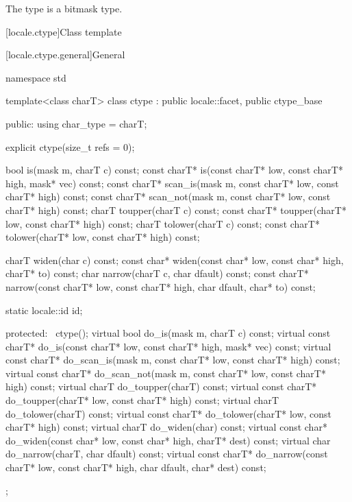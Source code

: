 \pnum
The type  is a bitmask type.

[locale.ctype]{Class template }

[locale.ctype.general]{General}

%
\begin{codeblock}
namespace std {
  template<class charT>
    class ctype : public locale::facet, public ctype_base {
    public:
      using char_type = charT;

      explicit ctype(size_t refs = 0);

      bool         is(mask m, charT c) const;
      const charT* is(const charT* low, const charT* high, mask* vec) const;
      const charT* scan_is(mask m, const charT* low, const charT* high) const;
      const charT* scan_not(mask m, const charT* low, const charT* high) const;
      charT        toupper(charT c) const;
      const charT* toupper(charT* low, const charT* high) const;
      charT        tolower(charT c) const;
      const charT* tolower(charT* low, const charT* high) const;

      charT        widen(char c) const;
      const char*  widen(const char* low, const char* high, charT* to) const;
      char         narrow(charT c, char dfault) const;
      const charT* narrow(const charT* low, const charT* high, char dfault, char* to) const;

      static locale::id id;

    protected:
      ~ctype();
      virtual bool         do_is(mask m, charT c) const;
      virtual const charT* do_is(const charT* low, const charT* high, mask* vec) const;
      virtual const charT* do_scan_is(mask m, const charT* low, const charT* high) const;
      virtual const charT* do_scan_not(mask m, const charT* low, const charT* high) const;
      virtual charT        do_toupper(charT) const;
      virtual const charT* do_toupper(charT* low, const charT* high) const;
      virtual charT        do_tolower(charT) const;
      virtual const charT* do_tolower(charT* low, const charT* high) const;
      virtual charT        do_widen(char) const;
      virtual const char*  do_widen(const char* low, const char* high, charT* dest) const;
      virtual char         do_narrow(charT, char dfault) const;
      virtual const charT* do_narrow(const charT* low, const charT* high,
                                     char dfault, char* dest) const;
    };
}
\end{codeblock}

